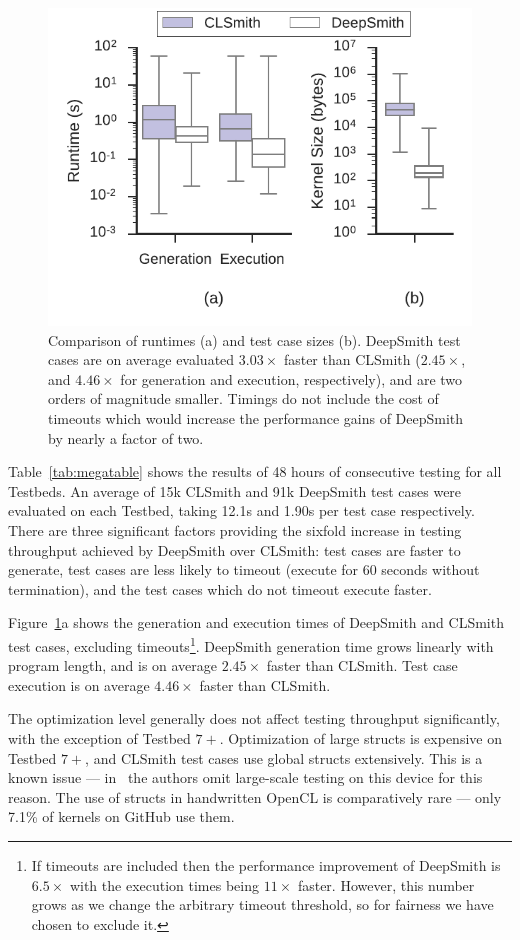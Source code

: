 \begin{figure}
  \centering %
  \includegraphics[width=.75\columnwidth]{img/vs-clsmith}%
  \caption{%
  Comparison of runtimes (a) and test case sizes (b). DeepSmith test cases
  are on average evaluated $3.03\times$ faster than CLSmith ($2.45\times$,
  and $4.46\times$ for generation and execution, respectively), and are two
  orders of magnitude smaller. Timings do not include the cost of timeouts
  which would increase the performance gains of DeepSmith by nearly a factor
  of two.
  }%
  \label{fig:vs-clsmith}
\end{figure}

Table~\ref{tab:megatable} shows the results of 48 hours of consecutive testing
for all Testbeds. An average of 15k CLSmith and 91k DeepSmith test cases were
evaluated on each Testbed, taking 12.1s and 1.90s per test case respectively.
There are three significant factors providing the sixfold increase in testing
throughput achieved by DeepSmith over CLSmith: test cases are faster to
generate, test cases are less likely to timeout (execute for 60 seconds without
termination), and the test cases which do not timeout execute faster.

Figure~\ref{fig:vs-clsmith}a shows the generation and execution times of
DeepSmith and CLSmith test cases, excluding timeouts\footnote{If timeouts are
included then the performance improvement of DeepSmith is $6.5\times$ with the
execution times being $11\times$ faster. However, this number grows as we change
the arbitrary timeout threshold, so for fairness we have chosen to exclude it.}.
DeepSmith generation time grows linearly with program length, and is on average
$2.45\times$ faster than CLSmith. Test case execution is on average $4.46\times$
faster than CLSmith.

The optimization level generally does not affect testing throughput
significantly, with the exception of Testbed $7+$. Optimization of large structs
is expensive on Testbed $7+$, and CLSmith test cases use global structs
extensively. This is a known issue --- in~\cite{Lidbury2015a} the authors omit
large-scale testing on this device for this reason. The use of structs in
handwritten OpenCL is comparatively rare --- only 7.1\% of kernels on GitHub use
them.


